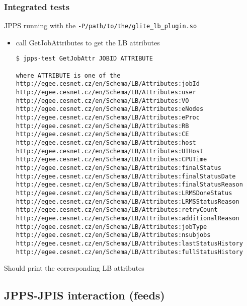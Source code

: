 \subsubsection{Integrated tests}
\req JPPS running with the \texttt{-P/path/to/the/glite\_lb\_plugin.so}

\how 
\begin{itemize}
\item call GetJobAttributes to get the LB attributes
\begin{verbatim}
$ jpps-test GetJobAttr JOBID ATTRIBUTE

where ATTRIBUTE is one of the 
http://egee.cesnet.cz/en/Schema/LB/Attributes:jobId
http://egee.cesnet.cz/en/Schema/LB/Attributes:user
http://egee.cesnet.cz/en/Schema/LB/Attributes:VO
http://egee.cesnet.cz/en/Schema/LB/Attributes:eNodes
http://egee.cesnet.cz/en/Schema/LB/Attributes:eProc
http://egee.cesnet.cz/en/Schema/LB/Attributes:RB
http://egee.cesnet.cz/en/Schema/LB/Attributes:CE
http://egee.cesnet.cz/en/Schema/LB/Attributes:host
http://egee.cesnet.cz/en/Schema/LB/Attributes:UIHost
http://egee.cesnet.cz/en/Schema/LB/Attributes:CPUTime
http://egee.cesnet.cz/en/Schema/LB/Attributes:finalStatus
http://egee.cesnet.cz/en/Schema/LB/Attributes:finalStatusDate
http://egee.cesnet.cz/en/Schema/LB/Attributes:finalStatusReason
http://egee.cesnet.cz/en/Schema/LB/Attributes:LRMSDoneStatus
http://egee.cesnet.cz/en/Schema/LB/Attributes:LRMSStatusReason
http://egee.cesnet.cz/en/Schema/LB/Attributes:retryCount
http://egee.cesnet.cz/en/Schema/LB/Attributes:additionalReason
http://egee.cesnet.cz/en/Schema/LB/Attributes:jobType
http://egee.cesnet.cz/en/Schema/LB/Attributes:nsubjobs
http://egee.cesnet.cz/en/Schema/LB/Attributes:lastStatusHistory
http://egee.cesnet.cz/en/Schema/LB/Attributes:fullStatusHistory
\end{verbatim}
\end{itemize}

\result Should print the corresponding LB attributes

\subsection{JPPS-JPIS interaction (feeds)}





